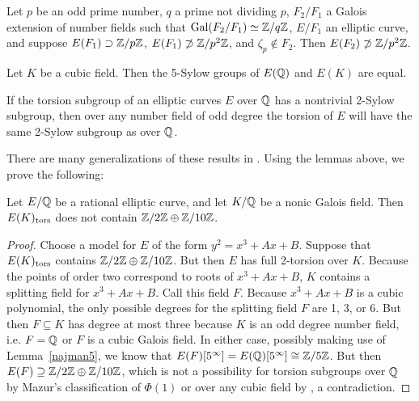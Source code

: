 \begin{lem} \label{najmangrow2}
Let $p$ be an odd prime number, $q$ a prime not dividing $p$, $F_2/F_1$ a Galois extension of number fields such that $\operatorname{Gal}(F_2/F_1) \simeq \mathbb{Z}/q\mathbb{Z}$, $E/F_1$ an elliptic curve, and suppose $E(F_1) \supset \mathbb{Z}/p\mathbb{Z}$, $E(F_1) \not\supset \mathbb{Z}/p^2\mathbb{Z}$, and $\zeta_p \notin F_2$. Then $E(F_2) \not\supset \mathbb{Z}/p^2\mathbb{Z}$.
\end{lem} 


\begin{lem} \label{najman5}
Let $K$ be a cubic field. Then the 5-Sylow groups of $E(\mathbb{Q})$ and $E(K)$ are equal.
\end{lem}


\begin{lem} \label{najman2}
If the torsion subgroup of an elliptic curves $E$ over $\mathbb{Q}$ has a nontrivial 2-Sylow subgroup, then over any number field of odd degree the torsion of $E$ will have the same 2-Sylow subgroup as over $\mathbb{Q}$. 
\end{lem}


There are many generalizations of these results in \cite{gonzalezjimeneznajman20base}. Using the lemmas above, we prove the following:


\begin{lem} \label{lem:no2-10}
Let $E/\mathbb{Q}$ be a rational elliptic curve, and let $K/\mathbb{Q}$ be a nonic Galois field. Then $E(K)_{\text{tors}}$ does not contain $\mathbb{Z}/2\mathbb{Z} \oplus \mathbb{Z}/10\mathbb{Z}$. 
\end{lem}

\begin{proof} 
Choose a model for $E$ of the form $y^2= x^3 + Ax + B$. Suppose that $E(K)_{\text{tors}}$ contains $\mathbb{Z}/2\mathbb{Z} \oplus \mathbb{Z}/10\mathbb{Z}$. But then $E$ has full 2-torsion over $K$. Because the points of order two correspond to roots of $x^3 + Ax + B$, $K$ contains a splitting field for $x^3 + Ax + B$. Call this field $F$. Because $x^3 + Ax + B$ is a cubic polynomial, the only possible degrees for the splitting field $F$ are 1, 3, or 6. But then $F \subseteq K$ has degree at most three because $K$ is an odd degree number field, i.e. $F= \mathbb{Q}$ or $F$ is a cubic Galois field. In either case, possibly making use of Lemma~\ref{najman5}, we know that $E(F)[5^\infty]= E(\mathbb{Q})[5^\infty] \cong \mathbb{Z}/5\mathbb{Z}$. But then $E(F) \supseteq \mathbb{Z}/2\mathbb{Z} \oplus \mathbb{Z}/10\mathbb{Z}$, which is not a possibility for torsion subgroups over $\mathbb{Q}$ by Mazur's classification of $\Phi(1)$ \cite{mazur77,mazur78} or over any cubic field by \cite{najman16}, a contradiction. 
\end{proof}  


